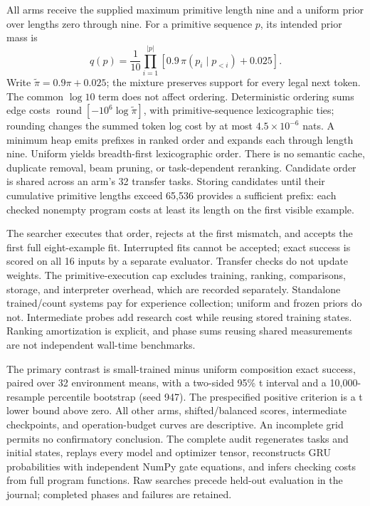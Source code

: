 \documentclass[11pt]{article}
\begin{document}
All arms receive the supplied maximum primitive length nine and a uniform
prior over lengths zero through nine. For a primitive sequence $p$, its
intended prior mass is
\[
 q(p)=\frac{1}{10}\prod_{i=1}^{|p|}
 \left[0.9\,\pi(p_i\mid p_{<i})+0.025\right].
\]
Write $\tilde\pi=0.9\pi+0.025$; the mixture preserves support for every legal
next token. The common $\log 10$ term does not affect ordering. Deterministic
ordering sums edge costs $\operatorname{round}[-10^6\log\tilde\pi]$,
with primitive-sequence lexicographic ties; rounding changes the summed
token log cost by at most $4.5\times10^{-6}$ nats. A minimum heap emits
prefixes in ranked order and expands each through length nine. Uniform yields
breadth-first lexicographic order. There is no semantic cache, duplicate
removal, beam pruning, or task-dependent reranking. Candidate order is shared
across an arm's 32 transfer tasks. Storing candidates until their cumulative
primitive lengths exceed 65,536 provides a sufficient prefix: each checked
nonempty program costs at least its length on the first visible example.

The searcher executes that order, rejects at the first mismatch, and accepts
the first full eight-example fit. Interrupted fits cannot be accepted; exact
success is scored on all 16 inputs by a separate evaluator. Transfer checks
do not update weights. The primitive-execution cap excludes training, ranking,
comparisons, storage, and interpreter overhead, which are recorded separately.
Standalone trained/count systems pay for experience collection; uniform and
frozen priors do not. Intermediate probes add research cost while reusing
stored training states. Ranking amortization is explicit, and phase sums
reusing shared measurements are not independent wall-time benchmarks.

The primary contrast is small-trained minus uniform composition exact success,
paired over 32 environment means, with a two-sided 95\% t interval and a
10,000-resample percentile bootstrap (seed 947). The prespecified positive
criterion is a t lower bound above zero. All other arms, shifted/balanced
scores, intermediate checkpoints, and operation-budget curves are descriptive.
An incomplete grid permits no confirmatory conclusion. The complete audit
regenerates tasks and initial states, replays every model and optimizer tensor,
reconstructs GRU probabilities with independent NumPy gate equations, and
infers checking costs from full program functions. Raw searches precede held-out
evaluation in the journal; completed phases and failures are retained.
\end{document}
